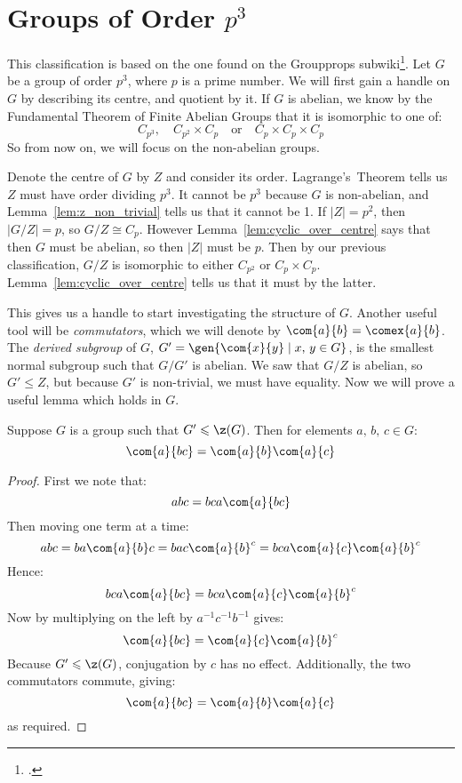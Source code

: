 \section{Groups of Order \(p^3\)}
This classification is based on the one found on the Groupprops subwiki\footcite{pcubed}.
Let \(G\) be a group of order \(p^3\), where \(p\) is a prime number.
We will first gain a handle on \(G\) by describing its centre, and quotient by it.
If \(G\) is abelian, we know by the Fundamental Theorem of Finite Abelian Groups that it is isomorphic to one of:
\[ C_{p^3}, \quad C_{p^2} \times C_p \quad \text{or} \quad C_p \times C_p \times C_p\]
So from now on, we will focus on the non-abelian groups.

Denote the centre of \(G\) by \(Z\) and consider its order.
Lagrange's~Theorem tells us \(Z\) must have order dividing \(p^3\).
It cannot be \(p^3\) because \(G\) is non-abelian, and Lemma~\ref{lem:z_non_trivial} tells us that it cannot be 1.
If \(|Z| = p^2\), then \(|G/Z| = p\), so \(G/Z \cong C_p\).
However Lemma~\ref{lem:cyclic_over_centre} says that then \(G\) must be abelian, so then \(|Z|\) must be \(p\).
Then by our previous classification, \(G/Z\) is isomorphic to either \(C_{p^2}\) or \(C_p \times C_p\).
Lemma~\ref{lem:cyclic_over_centre} tells us that it must by the latter.

This gives us a handle to start investigating the structure of \(G\).
Another useful tool will be \emph{commutators}, which we will denote by \(\com{a}{b} = \comex{a}{b}\).
The \emph{derived subgroup} of \(G\), \(G' = \gen{\com{x}{y} \mid x,\,y \in G}\), is the smallest normal
subgroup such that \(G/G'\) is abelian.
We saw that \(G/Z\) is abelian, so \(G' \leqslant Z\), but because \(G'\) is non-trivial, we must have equality.
Now we will prove a useful lemma which holds in \(G\).

\begin{lemma}\label{lem:comm}
    Suppose \(G\) is a group such that \(G' \leqslant \z(G)\).
    Then for elements \(a,\,b,\,c \in G\):
    \[\com{a}{bc} = \com{a}{b}\com{a}{c}\]
\end{lemma}

\begin{proof}
    First we note that:
    \[abc = bca\com{a}{bc}\]
    Then moving one term at a time:
    \[abc = ba\com{a}{b}c = bac\com{a}{b}^c = bca\com{a}{c}\com{a}{b}^c\]
    Hence:
    \[bca\com{a}{bc} = bca\com{a}{c}\com{a}{b}^c\]
    Now by multiplying on the left by \(a^{-1}c^{-1}b^{-1}\) gives:
    \[\com{a}{bc} = \com{a}{c}\com{a}{b}^c\]
    Because \(G' \leqslant \z(G)\), conjugation by \(c\) has no effect.
    Additionally, the two commutators commute, giving:
    \[\com{a}{bc} = \com{a}{b}\com{a}{c}\]
    as required.
\end{proof}

